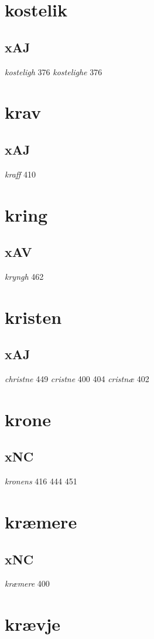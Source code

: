 \documentclass[a4paper,twocolumn]{article}
\begin{document}
\section{kostelik}
\label{sec:org048d64d}
\subsection{xAJ}
\label{sec:org44301d7}
\emph{kosteligh} 376 \emph{kostelighe} 376 
\section{krav}
\label{sec:orgb21f0e4}
\subsection{xAJ}
\label{sec:org24d3d7f}
\emph{kraff} 410 
\section{kring}
\label{sec:org50dc7ec}
\subsection{xAV}
\label{sec:org623dd98}
\emph{kryngh} 462 
\section{kristen}
\label{sec:org8ea0dab}
\subsection{xAJ}
\label{sec:org2789c6c}
\emph{christne} 449 \emph{cristne} 400 404 \emph{cristnæ} 402 
\section{krone}
\label{sec:org025eeb7}
\subsection{xNC}
\label{sec:org533d44f}
\emph{kronens} 416 444 451 
\section{kræmere}
\label{sec:orgaafd9cc}
\subsection{xNC}
\label{sec:org545df8c}
\emph{kræmere} 400 
\section{krævje}
\label{sec:org35e72a4}
\end{document}
